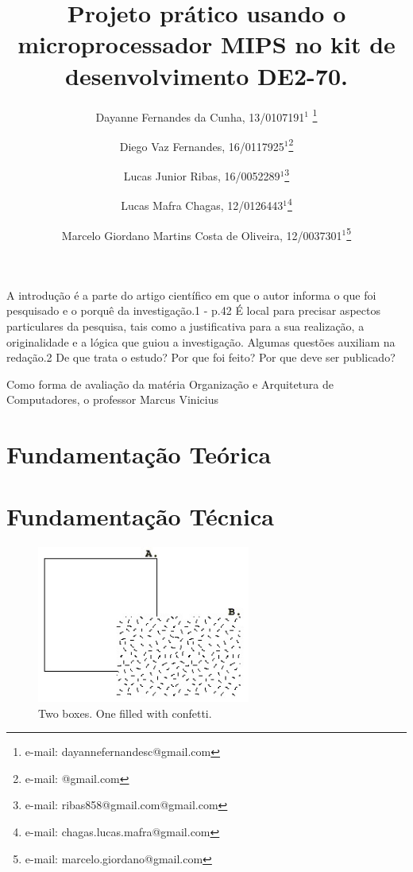 \documentclass{vgtc}                          %
\title{Projeto prático usando o microprocessador MIPS no kit de desenvolvimento DE2-70.}
\author{Dayanne Fernandes da Cunha, 13/0107191$^{1}$ \thanks{e-mail: dayannefernandesc@gmail.com}%
\and Diego Vaz Fernandes, 16/0117925$^{1}$\thanks{e-mail: @gmail.com}%
\and Lucas Junior Ribas, 16/0052289$^{1}$\thanks{e-mail: ribas858@gmail.com@gmail.com}
\and Lucas Mafra Chagas, 12/0126443$^{1}$\thanks{e-mail: chagas.lucas.mafra@gmail.com}
\and Marcelo Giordano Martins Costa de Oliveira, 12/0037301$^{1}$\thanks{e-mail: marcelo.giordano@gmail.com}}
\affiliation{\scriptsize $^{1}$Universidade de Brasília, Departamento de Ciência da Computação, Brasil}
\begin{document}


A introdução é a parte do artigo científico em que o autor informa o que foi pesquisado e o porquê da investigação.1 - p.42 É local para precisar aspectos particulares da pesquisa, tais como a justificativa para a sua realização, a originalidade e a lógica que guiou a investigação. Algumas questões auxiliam na redação.2 De que trata o estudo? Por que foi feito? Por que deve ser publicado?

Como forma de avaliação da matéria Organização e Arquitetura de Computadores, o professor \doctor Marcus Vinicius 



\maketitle



\section{Fundamentação Teórica}


\section{Fundamentação Técnica}


\begin{figure}[htb]
  \centering
  \includegraphics[width=2.76in]{figure.jpg}
  \caption{Two boxes. One filled with confetti.}
\end{figure}
\end{document}
